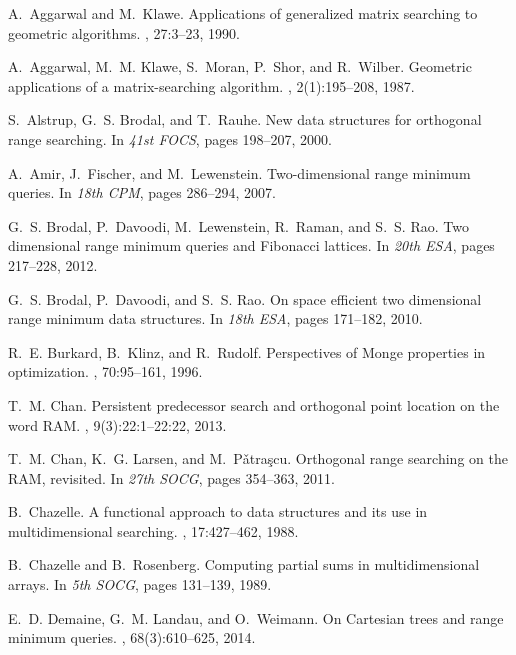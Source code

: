 \documentclass{llncs}
\begin{document}

\begin{thebibliography}{10}

A.~Aggarwal and M.~Klawe.
\newblock Applications of generalized matrix searching to geometric algorithms.
, 27:3--23, 1990.

A.~Aggarwal, M.~M. Klawe, S.~Moran, P.~Shor, and R.~Wilber.
\newblock Geometric applications of a matrix-searching algorithm.
, 2(1):195--208, 1987.

S.~Alstrup, G.~S. Brodal, and T.~Rauhe.
\newblock New data structures for orthogonal range searching.
\newblock In {\em 41st FOCS}, pages 198--207, 2000.

A.~Amir, J.~Fischer, and M.~Lewenstein.
\newblock Two-dimensional range minimum queries.
\newblock In {\em 18th CPM}, pages 286--294, 2007.

G.~S. Brodal, P.~Davoodi, M.~Lewenstein, R.~Raman, and S.~S. Rao.
\newblock Two dimensional range minimum queries and {F}ibonacci lattices.
\newblock In {\em 20th ESA}, pages 217--228, 2012.

G.~S. Brodal, P.~Davoodi, and S.~S. Rao.
\newblock On space efficient two dimensional range minimum data structures.
\newblock In {\em 18th ESA}, pages 171--182, 2010.

R.~E. Burkard, B.~Klinz, and R.~Rudolf.
\newblock Perspectives of {M}onge properties in optimization.
, 70:95--161, 1996.

T.~M. Chan.
\newblock Persistent predecessor search and orthogonal point location on the
  word {RAM}.
, 9(3):22:1--22:22, 2013.

T.~M. Chan, K.~G. Larsen, and M.~P{\v a}tra{\c s}cu.
\newblock Orthogonal range searching on the {RAM}, revisited.
\newblock In {\em 27th SOCG}, pages 354--363, 2011.

B.~Chazelle.
\newblock A functional approach to data structures and its use in
  multidimensional searching.
, 17:427--462, 1988.

B.~Chazelle and B.~Rosenberg.
\newblock Computing partial sums in multidimensional arrays.
\newblock In {\em 5th SOCG}, pages 131--139, 1989.

E.~D. Demaine, G.~M. Landau, and O.~Weimann.
\newblock On {C}artesian trees and range minimum queries.
, 68(3):610--625, 2014.


\end{thebibliography}
\end{document}
